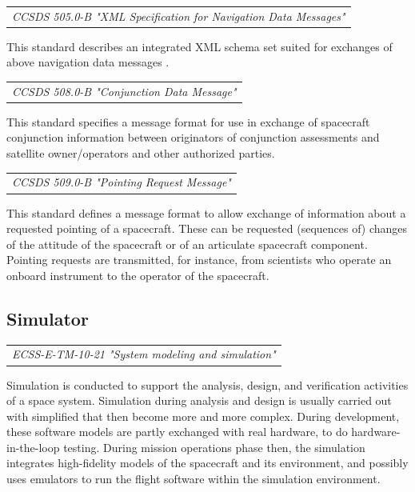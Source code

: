 \begin{tabular}{l}
\textit{CCSDS 505.0-B "XML Specification for Navigation Data Messages" \cite{CCSDS 505.0-B}} \\
\end{tabular}

This standard describes an integrated XML schema set suited for exchanges of above navigation data messages . 

\begin{tabular}{l}
\textit{CCSDS 508.0-B "Conjunction Data Message" \cite{CCSDS 508.0-B}} \\
\end{tabular}

This standard specifies a message format for use in exchange of spacecraft conjunction information between originators of conjunction assessments and satellite owner/operators and other authorized parties. 

\begin{tabular}{l}
\textit{CCSDS 509.0-B "Pointing Request Message" \cite{CCSDS 509.0-B}} \\
\end{tabular}

This standard defines a message format to allow exchange of information about a requested pointing of a spacecraft. These can be requested (sequences of) changes of the attitude of the spacecraft or of an articulate spacecraft component. Pointing requests are transmitted, for instance, from scientists who operate an onboard instrument to the operator of the  spacecraft.
  
\subsection{Simulator}

\begin{tabular}{l}
\textit{ECSS-E-TM-10-21 "System modeling and simulation" \cite{ECSS-E-TM-10-21}} \\
\end{tabular}

Simulation is conducted to support the analysis, design, and verification activities of a space system. Simulation during analysis and design is usually carried out with simplified that then become more and more complex. During development, these software models are partly exchanged with real hardware, to do hardware-in-the-loop testing. During mission operations phase then, the simulation integrates high-fidelity models of the spacecraft and its environment, and possibly uses emulators to run the flight software within the simulation environment.

